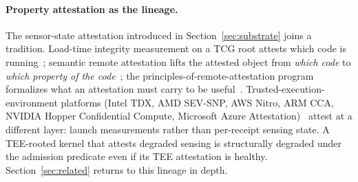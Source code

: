 \paragraph{Property attestation as the lineage.}
The sensor-state attestation introduced in Section~\ref{sec:substrate} joins a tradition. Load-time integrity measurement on a TCG root attests which code is running~\cite{sailerIMA2004}; semantic remote attestation lifts the attested object from \emph{which code} to \emph{which property of the code}~\cite{haldarSemanticAttestation2004}; the principles-of-remote-attestation program formalizes what an attestation must carry to be useful~\cite{cokerPrinciplesRemoteAttestation2011}. Trusted-execution-environment platforms (Intel TDX, AMD SEV-SNP, AWS Nitro, ARM CCA, NVIDIA Hopper Confidential Compute, Microsoft Azure Attestation)~\cite{chengTDXDemystified2024,amdSEVSNP2020,hammoudConfidentialCloud2023,msaa2025} attest at a different layer: launch measurements rather than per-receipt sensing state. A TEE-rooted kernel that attests degraded sensing is structurally degraded under the admission predicate even if its TEE attestation is healthy. Section~\ref{sec:related} returns to this lineage in depth.
